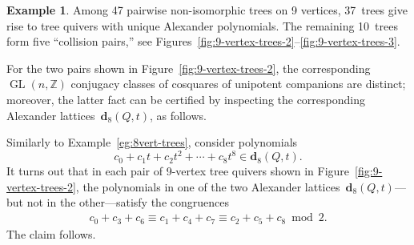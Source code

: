 \documentclass[11pt, letterpaper]{amsart}
\theoremstyle{definition}
\newtheorem{example}[theorem]{Example}
\numberwithin{equation}{section}
\def\ZZ{{\mathbb Z}}
\def\dd{{\mathbf{d}}}
\def\GL{{\operatorname{GL}}}
\begin{document}
\begin{example}
\label{eg:9-vertex-trees}
Among 47 pairwise non-isomorphic trees on 9 vertices, 
37~trees give rise to tree quivers with unique Alexander polynomials. 
The remaining 10~trees form five
``collision pairs,'' %
see Figures~\ref{fig:9-vertex-trees-2}--\ref{fig:9-vertex-trees-3}. 

For the two pairs shown in Figure~\ref{fig:9-vertex-trees-2}, 
the corresponding $\GL(n,\ZZ)$ conjugacy classes of cosquares of unipotent companions are distinct; 
moreover, the latter fact can be certified by inspecting the corresponding Alexander lattices~$\dd_8(Q,t)$, as follows.

Similarly to Example~\ref{eg:8vert-trees}, consider polynomials 
\begin{equation*}
c_0+c_1 t + c_2 t^2 +\cdots+ c_8 t^8 \in \dd_8(Q,t). 
\end{equation*}
It turns out that in each pair of 9-vertex tree quivers shown in Figure~\ref{fig:9-vertex-trees-2}, 
the polynomials in one of the two Alexander lattices~$\dd_8(Q,t)$---but not in the other---satisfy the congruences
\begin{align*}
c_0+c_3+c_6 \equiv c_1+c_4+c_7 \equiv c_2 + c_5+c_8 \bmod 2. 
\end{align*}
The claim follows. 

\pagebreak[3]



\end{example}
\end{document}
